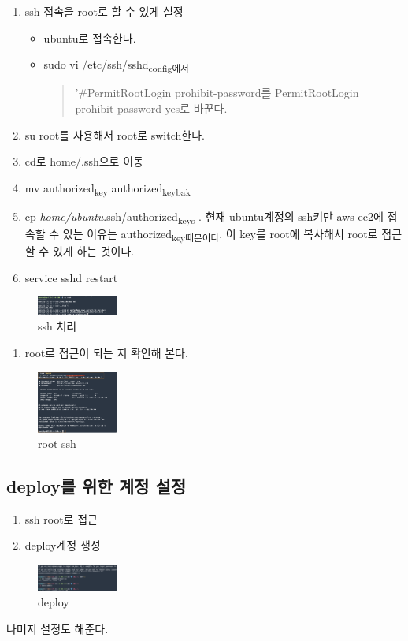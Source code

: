 \documentclass[11pt]{article}
\begin{document}
\begin{enumerate}
\item ssh 접속을 root로 할 수 있게 설정
\begin{itemize}
\item ubuntu로 접속한다.
\item sudo vi /etc/ssh/sshd\textsubscript{config에서}
\begin{quote}
'\#PermitRootLogin prohibit-password를
PermitRootLogin prohibit-password yes로 바꾼다.
\end{quote}
\end{itemize}
\item su root를 사용해서 root로 switch한다.
\item cd로 home/.ssh으로 이동
\item mv authorized\textsubscript{key} authorized\textsubscript{key}\textsubscript{bak}
\item cp \emph{home/ubuntu}.ssh/authorized\textsubscript{keys} .
현재 ubuntu계정의 ssh키만 aws ec2에 접속할 수 있는 이유는 authorized\textsubscript{key때문이다}. 이 key를 root에 복사해서 root로
접근할 수 있게 하는 것이다.
\item service sshd restart
\end{enumerate}
\begin{figure}[htbp]
\centering
\includegraphics[width=100px]{./img/ssh처리.png}
\caption{\label{fig:orgfd29321}ssh 처리}
\end{figure}
\begin{enumerate}
\item root로 접근이 되는 지 확인해 본다.
\end{enumerate}
\begin{figure}[htbp]
\centering
\includegraphics[width=100px]{./img/rootssh.png}
\caption{\label{fig:orgb6bf5a8}root ssh}
\end{figure}

\subsection{deploy를 위한 계정 설정}
\label{sec:orgf4e18b8}
\begin{enumerate}
\item ssh root로 접근
\item deploy계정 생성
\end{enumerate}
\begin{figure}[htbp]
\centering
\includegraphics[width=100px]{./img/deploy.png}
\caption{\label{fig:orgecd1460}deploy}
\end{figure}
나머지 설정도 해준다.
\begin{quote}
 
\end{quote}
\end{document}
